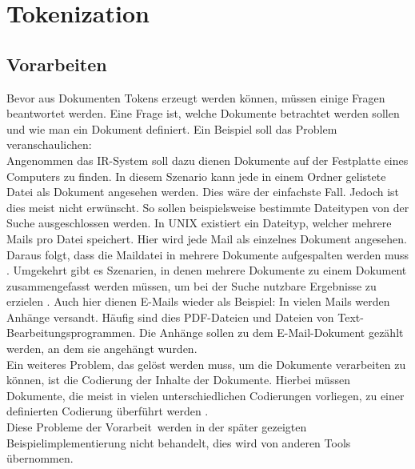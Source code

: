 \section{Tokenization}\label{token}
\subsection{Vorarbeiten}
Bevor aus Dokumenten Tokens erzeugt werden können, müssen einige Fragen beantwortet werden.
Eine Frage ist, welche Dokumente betrachtet werden sollen und wie man ein Dokument definiert. Ein Beispiel soll das Problem veranschaulichen:
\\
Angenommen das IR-System soll dazu dienen Dokumente auf der Festplatte eines Computers zu finden. In diesem Szenario kann jede in einem Ordner gelistete Datei als Dokument angesehen werden. Dies wäre der einfachste Fall. Jedoch ist dies meist nicht erwünscht. So sollen beispielsweise bestimmte Dateitypen von der Suche ausgeschlossen werden. In UNIX existiert ein Dateityp, welcher mehrere Mails pro Datei speichert. Hier wird jede Mail als einzelnes Dokument angesehen. Daraus folgt, dass die Maildatei in mehrere Dokumente aufgespalten werden muss \cite{IR_Intro_Cambridge}.
Umgekehrt gibt es Szenarien, in denen mehrere Dokumente zu einem Dokument zusammengefasst werden müssen, um bei der Suche nutzbare Ergebnisse zu erzielen \cite{IR_Intro_Cambridge}. Auch hier dienen E-Mails wieder als Beispiel: In vielen Mails werden Anhänge versandt. Häufig sind dies PDF-Dateien und Dateien von Text-Bearbeitungsprogrammen. Die Anhänge sollen zu dem E-Mail-Dokument gezählt werden, an dem sie angehängt wurden.
\\
Ein weiteres Problem, das gelöst werden muss, um die Dokumente verarbeiten zu können, ist die Codierung der Inhalte der Dokumente. Hierbei müssen Dokumente, die meist in vielen unterschiedlichen Codierungen vorliegen, zu einer definierten Codierung überführt werden \cite{IR_Intro_Cambridge}.
\\
Diese Probleme der \glqq Vorarbeit\grqq\ werden in der später gezeigten Beispielimplementierung nicht behandelt, dies wird von anderen Tools übernommen.


